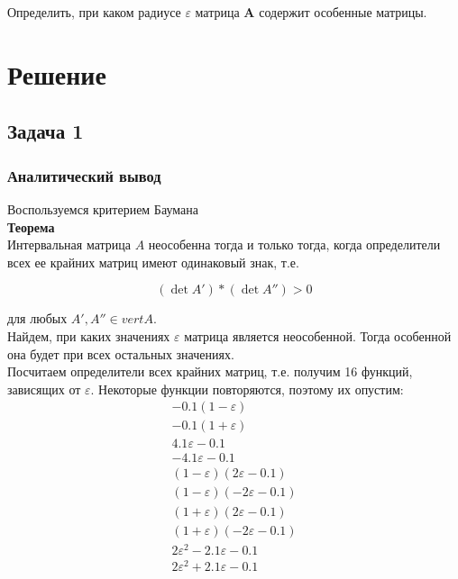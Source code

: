 Определить, при каком радиусе $\varepsilon$ матрица $\textbf{A}$ содержит особенные матрицы.



\section{Решение}

\subsection{Задача 1}

\subsubsection{Аналитический вывод}

Воспользуемся критерием Баумана \\

\textbf{Теорема} \\
Интервальная матрица $A$ неособенна тогда и только тогда, когда определители всех ее крайних матриц имеют одинаковый знак, т.е.

\begin{equation}
	(\det A') * (\det A'') > 0
\end{equation}

для любых $A', A'' \in vert A$. \\

Найдем, при каких значениях $\varepsilon$ матрица является неособенной. Тогда особенной она будет при всех остальных значениях. \\
Посчитаем определители всех крайних матриц, т.е. получим 16 функций, зависящих от $\varepsilon$. Некоторые функции повторяются, поэтому их опустим:
\begin{subequations} \label{eq}
	\begin{align}
		-0.1 (1 - \varepsilon)	\label{eq:1} \\
		-0.1 (1 + \varepsilon)	\label{eq:2} \\
		4.1 \varepsilon - 0.1	\label{eq:3} \\
		-4.1 \varepsilon - 0.1	\label{eq:4} \\
		(1 - \varepsilon) (2 \varepsilon - 0.1)	\label{eq:5} \\
		(1 - \varepsilon) (-2 \varepsilon - 0.1)	\label{eq:6} \\
		(1 + \varepsilon) (2 \varepsilon - 0.1)	\label{eq:7} \\
		(1 + \varepsilon) (-2 \varepsilon - 0.1)	\label{eq:8} \\
		2\varepsilon^{2} - 2.1\varepsilon - 0.1	\label{eq:9} \\
		2\varepsilon^{2} + 2.1\varepsilon - 0.1	\label{eq:10}
	\end{align}
\end{subequations}

